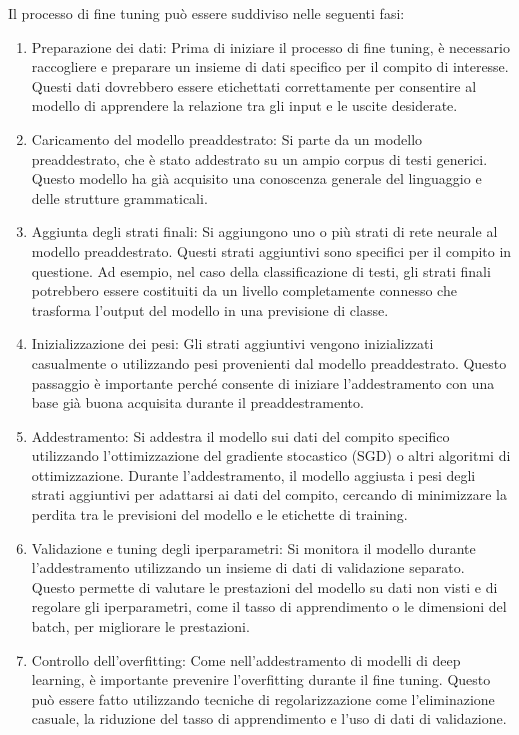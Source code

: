 Il processo di fine tuning può essere suddiviso nelle seguenti fasi:
\begin{enumerate}
    \item Preparazione dei dati: Prima di iniziare il processo di fine tuning, è necessario raccogliere e preparare un insieme di dati specifico per il compito di interesse. Questi dati dovrebbero essere etichettati correttamente per consentire al modello di apprendere la relazione tra gli input e le uscite desiderate.
    \item Caricamento del modello preaddestrato: Si parte da un modello preaddestrato, che è stato addestrato su un ampio corpus di testi generici. Questo modello ha già acquisito una conoscenza generale del linguaggio e delle strutture grammaticali.
    \item Aggiunta degli strati finali: Si aggiungono uno o più strati di rete neurale al modello preaddestrato. Questi strati aggiuntivi sono specifici per il compito in questione. Ad esempio, nel caso della classificazione di testi, gli strati finali potrebbero essere costituiti da un livello completamente connesso che trasforma l'output del modello in una previsione di classe.
    \item Inizializzazione dei pesi: Gli strati aggiuntivi vengono inizializzati casualmente o utilizzando pesi provenienti dal modello preaddestrato. Questo passaggio è importante perché consente di iniziare l'addestramento con una base già buona acquisita durante il preaddestramento.
    \item Addestramento: Si addestra il modello sui dati del compito specifico utilizzando l'ottimizzazione del gradiente stocastico (SGD) o altri algoritmi di ottimizzazione. Durante l'addestramento, il modello aggiusta i pesi degli strati aggiuntivi per adattarsi ai dati del compito, cercando di minimizzare la perdita tra le previsioni del modello e le etichette di training.
    \item Validazione e tuning degli iperparametri: Si monitora il modello durante l'addestramento utilizzando un insieme di dati di validazione separato. Questo permette di valutare le prestazioni del modello su dati non visti e di regolare gli iperparametri, come il tasso di apprendimento o le dimensioni del batch, per migliorare le prestazioni.
    \item Controllo dell'overfitting: Come nell'addestramento di modelli di deep learning, è importante prevenire l'overfitting durante il fine tuning. Questo può essere fatto utilizzando tecniche di regolarizzazione come l'eliminazione casuale, la riduzione del tasso di apprendimento e l'uso di dati di validazione.

\end{enumerate}
